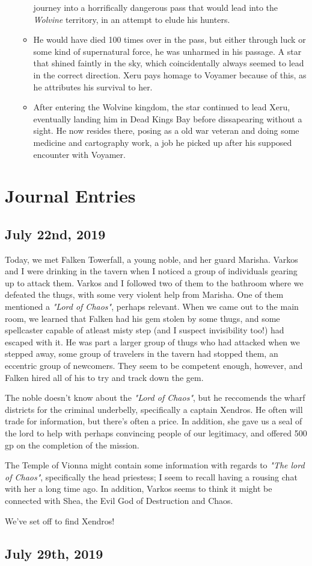 \documentclass[12pt]{article}
\begin{document}
\begin{itemize}
\begin{itemize}
          journey into a horrifically dangerous pass that would lead into the
          \textit{Wolvine} territory, in an attempt to elude his hunters.
        \item He would have died 100 times over in the pass, but either through
          luck or some kind of supernatural force, he was unharmed in his
          passage. A star that shined faintly in the sky, which coincidentally
          always seemed to lead in the correct direction. Xeru pays homage to
          Voyamer because of this, as he attributes his survival to her.
        \item After entering the Wolvine kingdom, the star continued to lead
          Xeru, eventually landing him in Dead Kings Bay before dissapearing
          without a sight. He now resides there, posing as a old war veteran and
          doing some medicine and cartography work, a job he picked up after his
          supposed encounter with Voyamer.
      \end{itemize}
  \end{itemize}
\fi

\section{Journal Entries}

\subsection{July 22nd, 2019}

{\Fontauri
Today, we met Falken Towerfall, a young noble, and her guard Marisha. Varkos and
I were drinking in the tavern when I noticed a group of individuals gearing up
to attack them. Varkos and I followed two of them to the bathroom where we
defeated the thugs, with some very violent help from Marisha. One of them
mentioned a \textit{"Lord of Chaos"}, perhaps relevant. When we came out to the
main room, we learned that Falken had his gem stolen by some thugs, and some
spellcaster capable of atleast misty step (and I suspect invisibility too!) had
escaped with it. He was part a larger group of thugs who had attacked when we
stepped away, some group of travelers in the tavern had stopped them, an
eccentric group of newcomers. They seem to be competent enough, however, and
Falken hired all of his to try and track down the gem.

The noble doesn't know about the \textit{"Lord of Chaos"}, but he reccomends the
wharf districts for the criminal underbelly, specifically a captain Xendros. He
often will trade for information, but there's often a price. In addition, she
gave us a seal of the lord to help with perhaps convincing people of our
legitimacy, and offered 500 gp on the completion of the mission.

The Temple of Vionna might contain some information with regards to \textit{"The
lord of Chaos"}, specifically the head priestess; I seem to recall having
a rousing chat with her a long time ago. In addition, Varkos seems to think it
might be connected with Shea, the Evil God of Destruction and Chaos. 

We've set off to find Xendros!
}

\subsection{July 29th, 2019}
{\Fontauri}
\end{document}
